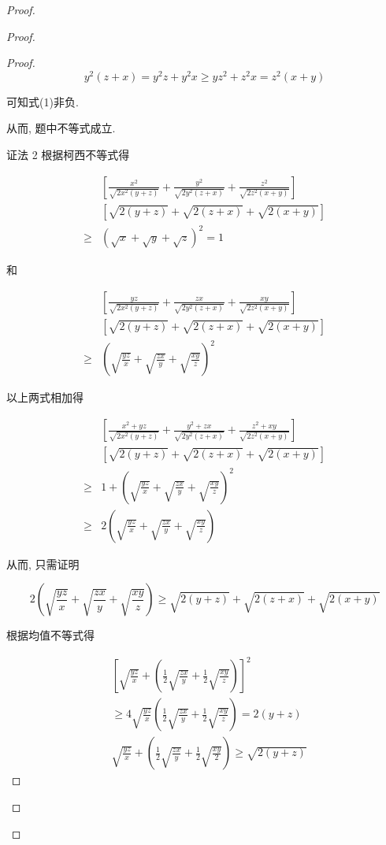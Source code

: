 \begin{proof}
\begin{example}
\begin{solution}
\begin{note}
\begin{solution}
\begin{proof}
\begin{proof}
	$$
	y^{2}(z+x)=y^{2} z+y^{2} x \geqslant y z^{2}+z^{2} x=z^{2}(x+y)
	$$
	
	可知式(1)非负.
	
	从而, 题中不等式成立.
	
	证法 2 根据柯西不等式得
	
	$$
	\begin{aligned}
	& {\left[\frac{x^{2}}{\sqrt{2 x^{2}(y+z)}}+\frac{y^{2}}{\sqrt{2 y^{2}(z+x)}}+\frac{z^{2}}{\sqrt{2 z^{2}(x+y)}}\right] } \\
	& {[\sqrt{2(y+z)}+\sqrt{2(z+x)}+\sqrt{2(x+y)}] } \\
	\geqslant & (\sqrt{x}+\sqrt{y}+\sqrt{z})^{2}=1
	\end{aligned}
	$$
	
	和
	
	$$
	\begin{aligned}
	& {\left[\frac{y z}{\sqrt{2 x^{2}(y+z)}}+\frac{z x}{\sqrt{2 y^{2}(z+x)}}+\frac{x y}{\sqrt{2 z^{2}(x+y)}}\right] } \\
	& {[\sqrt{2(y+z)}+\sqrt{2(z+x)}+\sqrt{2(x+y)}] } \\
	\geqslant & \left(\sqrt{\frac{y z}{x}}+\sqrt{\frac{z x}{y}}+\sqrt{\frac{x y}{z}}\right)^{2}
	\end{aligned}
	$$
	
	以上两式相加得
	
	$$
	\begin{aligned}
	& {\left[\frac{x^{2}+y z}{\sqrt{2 x^{2}(y+z)}}+\frac{y^{2}+z x}{\sqrt{2 y^{2}(z+x)}}+\frac{z^{2}+x y}{\sqrt{2 z^{2}(x+y)}}\right] } \\
	& {[\sqrt{2(y+z)}+\sqrt{2(z+x)}+\sqrt{2(x+y)}] } \\
	\geqslant & 1+\left(\sqrt{\frac{y z}{x}}+\sqrt{\frac{z x}{y}}+\sqrt{\frac{x y}{z}}\right)^{2} \\
	\geqslant & 2\left(\sqrt{\frac{y z}{x}}+\sqrt{\frac{z x}{y}}+\sqrt{\frac{x y}{z}}\right)
	\end{aligned}
	$$
	
	从而, 只需证明
	
	$$
	2\left(\sqrt{\frac{y z}{x}}+\sqrt{\frac{z x}{y}}+\sqrt{\frac{x y}{z}}\right) \geqslant \sqrt{2(y+z)}+\sqrt{2(z+x)}+\sqrt{2(x+y)}
	$$
	
	根据均值不等式得
	
	$$
	\begin{aligned}
	& {\left[\sqrt{\frac{y z}{x}}+\left(\frac{1}{2} \sqrt{\frac{z x}{y}}+\frac{1}{2} \sqrt{\frac{x y}{z}}\right)\right]^{2} } \\
	& \geqslant 4 \sqrt{\frac{y z}{x}}\left(\frac{1}{2} \sqrt{\frac{z x}{y}}+\frac{1}{2} \sqrt{\frac{x y}{z}}\right)=2(y+z) \\
	& \sqrt{\frac{y z}{x}}+\left(\frac{1}{2} \sqrt{\frac{z x}{y}}+\frac{1}{2} \sqrt{\frac{x y}{2}}\right) \geqslant \sqrt{2(y+z)}
	\end{aligned}
	$$
	

\end{proof}
\end{proof}
\end{solution}
\end{note}
\end{solution}
\end{example}
\end{proof}
